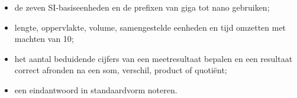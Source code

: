 \documentclass{ximera}
\begin{document}
\begin{definition}[title={Wat je na deze appendix moet kennen en kunnen}]\nl
    \begin{itemize}
        \item de zeven SI-basiseenheden en de prefixen van giga tot nano gebruiken;
        \item lengte, oppervlakte, volume, samengestelde eenheden en tijd omzetten met machten van 10;
        \item het aantal beduidende cijfers van een meetresultaat bepalen en een resultaat correct afronden na een som, verschil, product of quotiënt;
        \item een eindantwoord in standaardvorm noteren.
    \end{itemize}
\end{definition}
\end{document}
